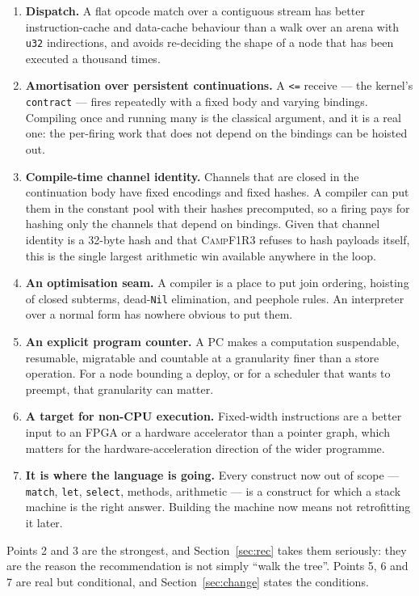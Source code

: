 \documentclass[11pt,a4paper]{article}
\newcommand{\code}[1]{\texttt{#1}}
\newcommand{\Camp}{\textsc{CampF1R3}}
\theoremstyle{definition}
\theoremstyle{plain}
\begin{document}
\begin{enumerate}[leftmargin=1.8em,nosep]
\item \textbf{Dispatch.} A flat opcode match over a contiguous stream has better
instruction-cache and data-cache behaviour than a walk over an arena with
\code{u32} indirections, and avoids re-deciding the shape of a node that has
been executed a thousand times.
\item \textbf{Amortisation over persistent continuations.} A \code{<=} receive
--- the kernel's \code{contract} --- fires repeatedly with a fixed body and
varying bindings. Compiling once and running many is the classical argument, and
it is a real one: the per-firing work that does not depend on the bindings can
be hoisted out.
\item \textbf{Compile-time channel identity.} Channels that are closed in the
continuation body have fixed encodings and fixed hashes. A compiler can put them
in the constant pool with their hashes precomputed, so a firing pays for hashing
only the channels that depend on bindings. Given that channel identity is a
32-byte hash and that \Camp{} refuses to hash payloads itself, this is the
single largest arithmetic win available anywhere in the loop.
\item \textbf{An optimisation seam.} A compiler is a place to put join
ordering, hoisting of closed subterms, dead-\code{Nil} elimination, and
peephole rules. An interpreter over a normal form has nowhere obvious to put
them.
\item \textbf{An explicit program counter.} A PC makes a computation
suspendable, resumable, migratable and countable at a granularity finer than a
store operation. For a node bounding a deploy, or for a scheduler that wants to
preempt, that granularity can matter.
\item \textbf{A target for non-CPU execution.} Fixed-width instructions are a
better input to an FPGA or a hardware accelerator than a pointer graph, which
matters for the hardware-acceleration direction of the wider programme.
\item \textbf{It is where the language is going.} Every construct now out of
scope --- \code{match}, \code{let}, \code{select}, methods, arithmetic --- is a
construct for which a stack machine is the right answer. Building the machine
now means not retrofitting it later.
\end{enumerate}

\noindent
Points 2 and 3 are the strongest, and Section~\ref{sec:rec} takes them
seriously: they are the reason the recommendation is not simply ``walk the
tree''. Points 5, 6 and 7 are real but conditional, and
Section~\ref{sec:change} states the conditions.
\end{document}
